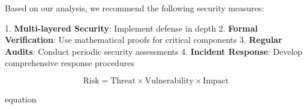 Based on our analysis, we recommend the following security measures:

1. \textbf{Multi-layered Security}: Implement defense in depth
2. \textbf{Formal Verification}: Use mathematical proofs for critical components
3. \textbf{Regular Audits}: Conduct periodic security assessments
4. \textbf{Incident Response}: Develop comprehensive response procedures

\begin{equation}
\text{Risk} = \text{Threat} \times \text{Vulnerability} \times \text{Impact}
\end{equation}

equation